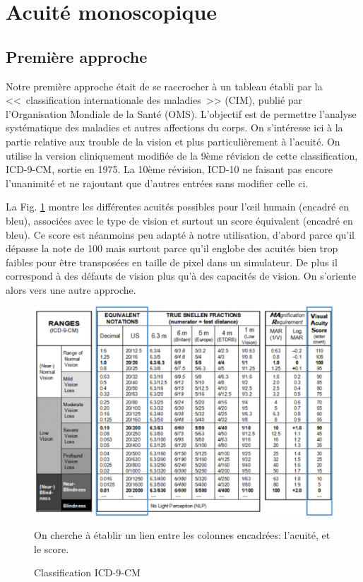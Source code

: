 	\section{Acuité monoscopique}
	
	\subsection{Première approche}	
	\par Notre première approche était de se raccrocher à un tableau établi par la <<~classification internationale des maladies~>> (CIM), publié par l'Organisation Mondiale de la Santé (OMS). L'objectif est de permettre l'analyse systématique des maladies et autres affections du corps. On s'intéresse ici à la partie relative aux trouble de la vision et plus particulièrement à l'acuité. On utilise la version cliniquement modifiée de la 9ème révision de cette classification, ICD-9-CM, sortie en 1975. La 10ème révision, ICD-10 ne faisant pas encore l'unanimité et ne rajoutant que d'autres entrées sans modifier celle ci.
	
	\par La Fig. \ref{fig:icd_9_cdm} montre les différentes acuités possibles pour l'œil humain (encadré en bleu), associées avec le type de vision et surtout un score équivalent (encadré en bleu). Ce score est néanmoins peu adapté à notre utilisation, d'abord parce qu'il dépasse la note de 100 mais surtout parce qu'il englobe des acuités bien trop faibles pour être transposées en taille de pixel dans un simulateur. De plus il correspond à des défauts de vision plus qu'à des capacités de vision. On s'oriente alors vers une autre approche.
	
	\begin{figure}
		\centering
		\includegraphics[scale=.6]{Figures/AcuityICD9CM}
		\caption{Classification ICD-9-CM}{On cherche à établir un lien entre les colonnes encadrées: l'acuité, et le score.}
		\label{fig:icd_9_cdm}
	\end{figure}
	
